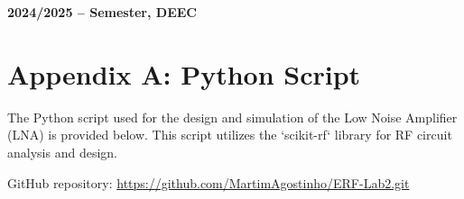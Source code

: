 \documentclass[12pt]{article}
\begin{document}

\vspace{5cm}

\begin{center}
    \large \bf 2024/2025 --  Semester, DEEC
\end{center}

\thispagestyle{empty}

\setcounter{page}{0}

\newpage

\newpage

\tableofcontents %

\newpage

\listoffigures
\listoftables

\newpage

%

\pagebreak

\pagebreak

\pagebreak

\pagebreak

\pagebreak

\pagebreak

\newpage


\newpage
\appendix
\section{Appendix A: Python Script}

The Python script used for the design and simulation of the Low Noise Amplifier (LNA) is provided below. This script utilizes the `scikit-rf` library for RF circuit analysis and design.

GitHub repository: \url{https://github.com/MartimAgostinho/ERF-Lab2.git}
\label{appendix:python_script}
\end{document}
